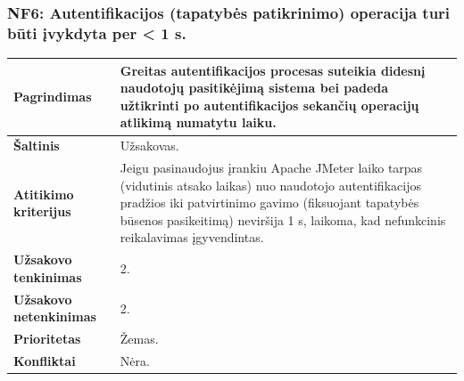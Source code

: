 \documentclass[12pt]{article}
\begin{document}
\subsubsection*{NF6: Autentifikacijos (tapatybės patikrinimo) operacija turi
būti įvykdyta per < 1 s.}
\label{sec:NF6}
\begin{table}[htb!]
    \captionsetup{justification=centering}
    \begin{tabular}{|m{4.9cm}|m{11cm}|}
        \hline
        \raggedleft \textbf{\cellcolor{deepchampagne}Pagrindimas} &
        Greitas autentifikacijos procesas suteikia didesnį naudotojų
        pasitikėjimą sistema bei padeda užtikrinti po autentifikacijos sekančių
        operacijų atlikimą numatytu laiku. \\
        \hline
        \raggedleft \textbf{\cellcolor{deepchampagne}Šaltinis} & Užsakovas. \\
        \hline
        \raggedleft \textbf{\cellcolor{deepchampagne}Atitikimo kriterijus} & 
        Jeigu pasinaudojus įrankiu Apache JMeter laiko tarpas (vidutinis atsako
        laikas) nuo naudotojo autentifikacijos pradžios iki patvirtinimo gavimo
        (fiksuojant tapatybės būsenos pasikeitimą) neviršija 1 s, laikoma, kad
        nefunkcinis reikalavimas įgyvendintas. \\
        \hline
        \raggedleft \textbf{\cellcolor{deepchampagne}Užsakovo tenkinimas} & 2. \\
        \hline
        \raggedleft \textbf{\cellcolor{deepchampagne}Užsakovo netenkinimas} & 2. \\
        \hline
        \raggedleft \textbf{\cellcolor{deepchampagne}Prioritetas} & Žemas. \\
        \hline
        \raggedleft \textbf{\cellcolor{deepchampagne}Konfliktai} & Nėra. \\
        \hline
    \end{tabular}
\end{table}
\end{document}
